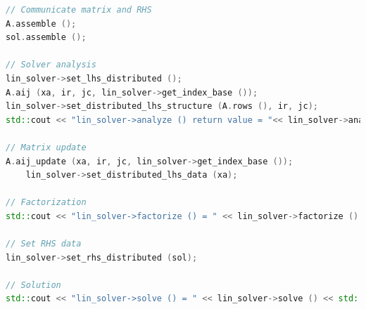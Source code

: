 \documentclass{Configuration_Files/PoliMi3i_thesis}
\begin{document}
\begin{lstlisting}[language=C++]
// Communicate matrix and RHS
A.assemble ();
sol.assemble ();

// Solver analysis
lin_solver->set_lhs_distributed ();
A.aij (xa, ir, jc, lin_solver->get_index_base ());
lin_solver->set_distributed_lhs_structure (A.rows (), ir, jc);
std::cout << "lin_solver->analyze () return value = "<< lin_solver->analyze () << std::endl;

// Matrix update
A.aij_update (xa, ir, jc, lin_solver->get_index_base ());
    lin_solver->set_distributed_lhs_data (xa);

// Factorization
std::cout << "lin_solver->factorize () = " << lin_solver->factorize () << std::endl;

// Set RHS data
lin_solver->set_rhs_distributed (sol);

// Solution
std::cout << "lin_solver->solve () = " << lin_solver->solve () << std::endl;
\end{lstlisting}
\end{document}
